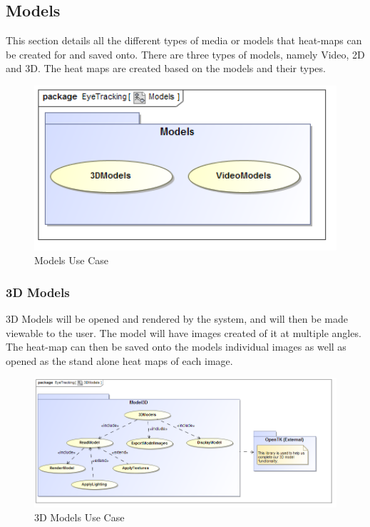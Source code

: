 \subsection{Models}
This section details all the different types of media or models that heat-maps can be created for and saved onto. There are three types of models, namely Video, 2D and 3D. The heat maps are created based on the models and their types.
\newline
\begin{figure}[!ht]
	\centering	
	\includegraphics[scale=0.5,width=15cm,keepaspectratio]{Diagrams/Use_Case_Diagram__Models.png}
	\caption{Models Use Case}
\end{figure}
	
	\subsubsection{3D Models}
	3D Models will be opened and rendered by the system, and will then be made viewable to the user. The model will have images created of it at multiple angles. The heat-map can then be saved onto the models individual images as well as opened as the stand alone heat maps of each image.
	\newline
	\begin{figure}[!ht]
		\centering
		\includegraphics[scale=0.5,width=15cm,keepaspectratio]{Diagrams/Use_Case_Diagram__3DModels.png}
		\caption{3D Models Use Case}
	\end{figure}
	
